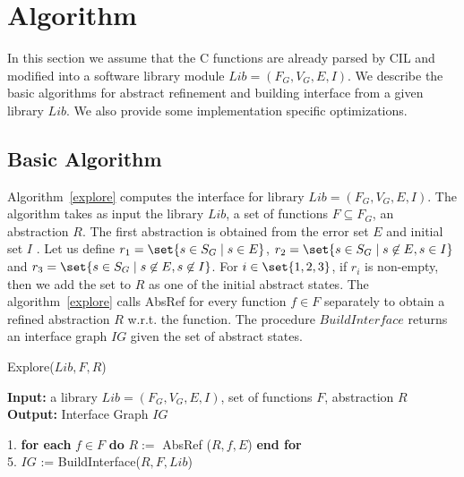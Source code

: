 \documentclass{llncs}
\begin{document}
\section{Algorithm}

In this section we assume that the C functions are already parsed by CIL and modified into a 
software library module $Lib = (F_G, V_G, E, I)$.
We describe the basic algorithms for abstract refinement and building interface
from a given library $Lib$.
We also provide some implementation specific optimizations. 
\subsection{Basic Algorithm}
 Algorithm~\ref{explore} computes the interface for library $Lib = (F_G, V_G, E, I)$.
 The algorithm takes as input the library $Lib$, a set of functions $F \subseteq F_G$,  an abstraction $R$.
The first abstraction is obtained from the error set $E$ and initial set $I$ .
Let us define $r_1 = \set{s \in S_G \mid s \in E}$, 
$r_2 = \set{s \in S_G \mid  s \not\in E, s\in I}$ and $r_3 = \set{s \in S_G \mid s \not\in E, s \not\in I}$.
For $i \in \set{1,2,3}$, if  $r_i$ is non-empty, then we add the set to $R$ as one of the initial abstract states.
The algorithm~\ref{explore} calls AbsRef for every function $f \in F$ separately to obtain a refined abstraction $R$ w.r.t. the function.
The procedure $BuildInterface$ returns an interface graph $IG$ given the set of abstract states. 

\begin{algorithm}
\caption{Explore($Lib, F, R$)} \label{explore}
{\bf Input:}  a library $Lib = (F_G, V_G, E, I)$, set of functions $F$, abstraction $R$\\
 {\bf Output:} Interface Graph $IG$ 
 \vspace*{-1ex}
\begin{tabbing}
1.     
\= 
{\bf for each} $f \in F$ {\bf do}  $R { := }$ AbsRef ($R,f, E$) {\bf end for}\\
5. \>   $IG$ := BuildInterface($R, F, Lib$)\\
\end{tabbing}
\vspace*{-3ex}
\end{algorithm}
\end{document}
